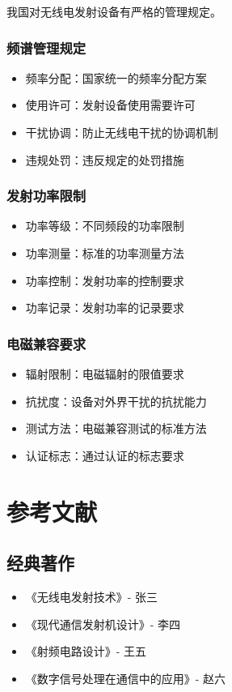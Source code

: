 \documentclass[12pt,UTF8]{ctexbook}
\begin{document}
我国对无线电发射设备有严格的管理规定。

\subsection{频谱管理规定}
\begin{itemize}[leftmargin=3.5em]
    \item 频率分配：国家统一的频率分配方案
    \item 使用许可：发射设备使用需要许可
    \item 干扰协调：防止无线电干扰的协调机制
    \item 违规处罚：违反规定的处罚措施
\end{itemize}

\subsection{发射功率限制}
\begin{itemize}[leftmargin=3.5em]
    \item 功率等级：不同频段的功率限制
    \item 功率测量：标准的功率测量方法
    \item 功率控制：发射功率的控制要求
    \item 功率记录：发射功率的记录要求
\end{itemize}

\subsection{电磁兼容要求}
\begin{itemize}[leftmargin=3.5em]
    \item 辐射限制：电磁辐射的限值要求
    \item 抗扰度：设备对外界干扰的抗扰能力
    \item 测试方法：电磁兼容测试的标准方法
    \item 认证标志：通过认证的标志要求
\end{itemize}

\backmatter

\chapter{参考文献}

\section{经典著作}
\begin{itemize}[leftmargin=3.5em]
    \item 《无线电发射技术》- 张三
    \item 《现代通信发射机设计》- 李四
    \item 《射频电路设计》- 王五
    \item 《数字信号处理在通信中的应用》- 赵六
\end{itemize}
\end{document}
